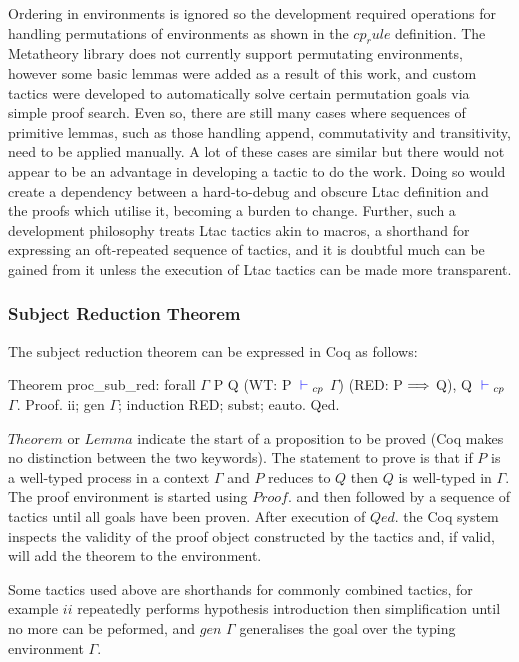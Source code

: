 Ordering in environments is ignored so the development required operations for
handling permutations of environments as shown in the \coqe$cp_rule$
definition. The Metatheory library does not currently support permutating
environments, however some basic lemmas were added as a result of this work,
and custom tactics were developed to automatically solve certain permutation
goals via simple proof search. Even so, there are still many cases where
sequences of primitive lemmas, such as those handling append, commutativity
and transitivity, need to be applied manually. A lot of these cases are
similar but there would not appear to be an advantage in developing a tactic
to do the work. Doing so would create a dependency between a hard-to-debug and
obscure Ltac definition and the proofs which utilise it, becoming a burden to
change. Further, such a development philosophy treats Ltac tactics akin to
macros, a shorthand for expressing an oft-repeated sequence of tactics, and it
is doubtful much can be gained from it unless the execution of Ltac tactics
can be made more transparent.

\subsubsection{Subject Reduction Theorem}

The subject reduction theorem can be expressed in Coq as follows:
\begin{coq}
Theorem proc_sub_red:
  forall $\Gamma$ P Q
         (WT: P ${\color{blue} {} \vdash {}}_{cp}$ $\Gamma$)
         (RED: P $\Longrightarrow$ Q),
    Q ${\color{blue} {} \vdash {}}_{cp}$ $\Gamma$.
Proof. ii; gen $\Gamma$; induction RED; subst; eauto. Qed.
\end{coq}

\coqe$Theorem$ or \coqe$Lemma$ indicate the start of a proposition to be
proved (Coq makes no distinction between the two keywords). The statement to
prove is that if \coqe$P$ is a well-typed process in a context $\Gamma$ and
\coqe$P$ reduces to \coqe$Q$ then \coqe$Q$ is well-typed in $\Gamma$. The
proof environment is started using \coqe$Proof.$ and then followed by a
sequence of tactics until all goals have been proven. After execution of
\coqe$Qed.$ the Coq system inspects the validity of the proof object
constructed by the tactics and, if valid, will add the theorem to the
environment.

Some tactics used above are shorthands for commonly combined tactics, for
example \coqe$ii$ repeatedly performs hypothesis introduction then
simplification until no more can be peformed, and \coqe$gen$ $\Gamma$
generalises the goal over the typing environment $\Gamma$.


